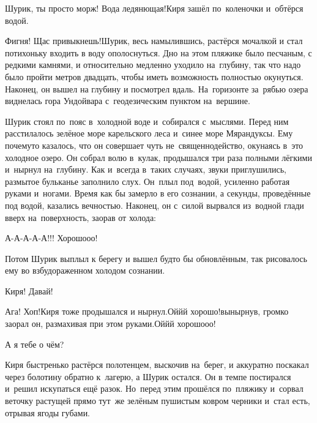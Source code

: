 \diagdash Шурик, ты просто морж! Вода ледянющая!\mdash Киря зашёл по~коленочки и~обтёрся водой.

\diagdash Фигня! Щас привыкнешь!\mdash Шурик, весь намылившись, растёрся мочалкой и стал потихоньку входить в воду ополоснуться. Дно на этом пляжике было песчаным, с редкими камнями, и относительно медленно уходило на~глубину, так что надо было пройти метров двадцать, чтобы иметь возможность полностью окунуться. Наконец, он вышел на глубину и посмотрел вдаль. На~горизонте за~рябью озера виднелась гора Ундойвара с~геодезическим пунктом на~вершине.  

Шурик стоял по~пояс в~холодной воде и~собирался с~мыслями. Перед ним расстилалось зелёное море карельского леса и~синее море Мярандуксы. Ему почему\sdash то казалось, что он совершает чуть не~священнодейство, окунаясь в~это холодное озеро. Он собрал волю в~кулак, продышался три раза полными лёгкими и~нырнул на~глубину. Как и~всегда в~таких случаях, звуки приглушились, размытое бульканье заполнило слух. Он~плыл под~водой, усиленно работая руками и~ногами. Время как бы замерло в его сознании, а секунды, проведённые под водой, казались вечностью. Наконец, он с~силой вырвался из~водной глади вверх на~поверхность, заорав от холода:

\diagdash А-А-А-А-А!!! Хорошо\sdash о\sdash о!
\nopagebreak

Потом Шурик выплыл к берегу и вышел будто бы обновлённым, так рисовалось ему во взбудораженном холодом сознании.

\diagdash Киря! Давай!

\diagdash Ага! Хоп!\mdash Киря тоже продышался и нырнул.\mdash Ой\sdash й\sdash й хорошо!\mdash вынырнув, громко заорал он, размахивая при этом руками.\mdash Ой\sdash й\sdash й хорошо\sdash о\sdash о!

\diagdash А я тебе о чём?

Киря быстренько растёрся полотенцем, выскочив на~берег, и аккуратно поскакал через болотину обратно к~лагерю, а Шурик остался. Он в темпе постирался и~решил искупаться ещё разок. Но~перед этим прошёлся по~пляжику и~сорвал веточку растущей прямо тут~же зелёным пушистым ковром черники и~стал есть, отрывая ягоды губами. 



